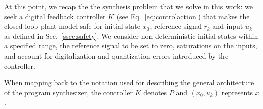 \documentclass[runningheads,a4paper]{llncs}
\begin{document}
At this point, we recap the the synthesis problem that we solve in this work:
we seek a digital feedback controller $K$ (see Eq.~\ref{eq:controlaction})
that makes the closed-loop plant model safe for 
initial state $x_0$, reference signal $r_k$ and input $u_k$
as defined in Sec.~\ref{ssec:safety}. 
We consider non-deterministic initial states within a specified range, 
the reference signal to be set to zero, 
saturations on the inputs, 
and account for digitalization and quantization errors introduced by the controller.  

When mapping back to the notation used for describing the general architecture of the program synthesizer, 
the controller $K$ denotes $P$ and $(x_0, u_k)$ represents $x$. 



\end{document}
